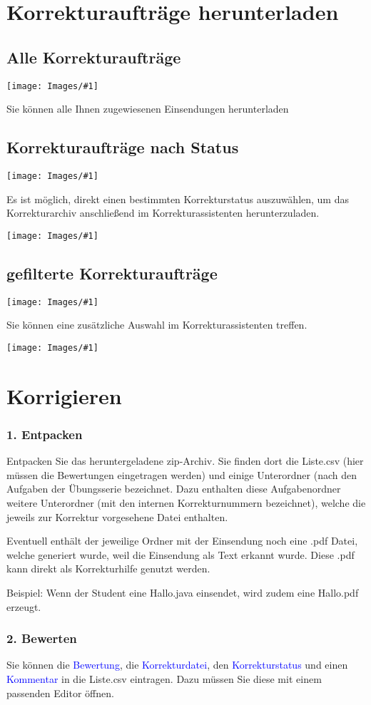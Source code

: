 \documentclass[a4paper,final, parskip]{scrartcl}
\title
{}
\author 
{}
\date{\vspace{12cm}\monthword{\the\month}\space\the\year}
\subtitle
{}
\numberwithin{equation}{section}
\newcommand{\blau}[1]{\textcolor{blue}{#1}}
\newenvironment{Bilder}
  {\par\raggedbottom\null\noindent\minipage{\textwidth}\centering}
  {\endminipage\vspace{0.7cm}}
\newcommand{\tbild}[1]{
\begin{Bilder}
 \texttt{[image: Images/\#1]}
	\end{Bilder}
}
\begin{document}
\pagestyle{seite}
\section{Korrekturaufträge herunterladen}
\subsection{Alle Korrekturaufträge}
\tbild{pathA.png}
Sie können alle Ihnen zugewiesenen Einsendungen herunterladen

\subsection{Korrekturaufträge nach Status}
\tbild{pathB.png}
Es ist möglich, direkt einen bestimmten Korrekturstatus auszuwählen, um das Korrekturarchiv anschließend im Korrekturassistenten herunterzuladen.
\tbild{pathC.png}

\subsection{gefilterte Korrekturaufträge}
\tbild{pathD.png}
Sie können eine zusätzliche Auswahl im Korrekturassistenten treffen.
\tbild{pathE.png}

\newpage
\section{Korrigieren}
\subsubsection*{1. Entpacken}
Entpacken Sie das heruntergeladene zip-Archiv.
Sie finden dort die Liste.csv (hier müssen die Bewertungen eingetragen werden) und einige Unterordner (nach den Aufgaben der Übungsserie bezeichnet. Dazu enthalten diese Aufgabenordner weitere Unterordner (mit den internen Korrekturnummern bezeichnet), welche die jeweils zur Korrektur vorgesehene Datei enthalten.

Eventuell enthält der jeweilige Ordner mit der Einsendung noch eine .pdf Datei, welche generiert wurde, weil die Einsendung als Text erkannt wurde. Diese .pdf kann direkt als Korrekturhilfe genutzt werden.

Beispiel: Wenn der Student eine Hallo.java einsendet, wird zudem eine Hallo.pdf erzeugt. 

\newpage
\subsubsection*{2. Bewerten}
Sie können die \blau{Bewertung}, die \blau{Korrekturdatei}, den \blau{Korrekturstatus} und einen \blau{Kommentar} in die Liste.csv eintragen. Dazu müssen Sie diese mit einem passenden Editor öffnen. 
\end{document}
